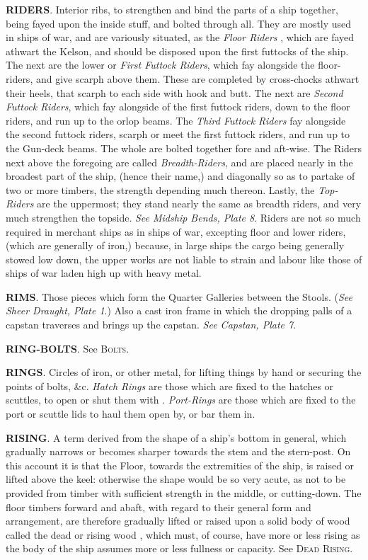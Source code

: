 \textbf{RIDERS}. Interior ribs, to strengthen and bind the parts of a ship together, being fayed upon the inside stuff, and bolted through all. They are mostly used in ships of war, and are variously situated, as the \textit{Floor Riders} , which are fayed athwart the Kelson, and should be disposed upon the first futtocks of the ship. The next are the lower or \textit{First Futtock Riders}, which fay alongside the floor-riders, and give scarph above them. These are completed by cross-chocks athwart their heels, that scarph to each side with hook and butt. The next are \textit{Second Futtock Riders}, which fay alongside of the first futtock riders, down to the floor riders, and run up to the orlop beams. The \textit{Third Futtock Riders} fay alongside the second futtock riders, scarph or meet the first futtock riders, and run up to the Gun-deck beams. The whole are bolted together fore and aft-wise. The Riders next above the foregoing are called \textit{Breadth-Riders}, and are placed nearly in the broadest part of the ship, (hence their name,) and diagonally so as to partake of two or more timbers, the strength depending much thereon. Lastly, the \textit{Top-Riders} are the uppermost; they stand nearly the same as breadth riders, and very much strengthen the topside. \textit{See Midship Bends, Plate 8}. Riders are not so much required in merchant ships as in ships of war, excepting floor and lower riders, (which are generally of iron,) because, in large ships the cargo being generally stowed low down, the upper works are not liable to strain and labour like those of ships of war laden high up with heavy metal. 

\textbf{RIMS}. Those pieces which form the Quarter Galleries between the Stools. (\textit{See Sheer Draught, Plate 1}.) Also a cast iron frame in which the dropping palls of a capstan traverses and brings up the capstan. \textit{See Capstan, Plate 7}. 

\textbf{RING-BOLTS}. See \textsc{Bolts}. 

\textbf{RINGS}. Circles of iron, or other metal, for lifting things by hand or securing the points of bolts, \&c. \textit{Hatch Rings} are those which are fixed to the hatches or scuttles, to open or shut them with . \textit{Port-Rings} are those which are fixed to the port or scuttle lids to haul them open by, or bar them in. 

\textbf{RISING}. A term derived from the shape of a ship’s bottom in general, which gradually narrows or becomes sharper towards the stem and the stern-post. On this account it is that the Floor, towards the extremities of the ship, is raised or lifted above the keel: otherwise the shape would be so very acute, as not to be provided from timber with sufficient strength in the middle, or cutting-down. The floor timbers forward and abaft, with regard to their general form and arrangement, are therefore gradually lifted or raised upon a solid body of wood called the dead or rising wood , which must, of course, have more or less rising as the body of the ship assumes more or less fullness or capacity. See \textsc{Dead Rising}. 

